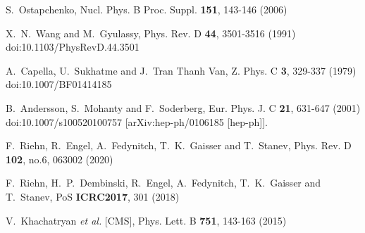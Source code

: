 \begin{thebibliography}{99}
S.~Ostapchenko,
Nucl. Phys. B Proc. Suppl. \textbf{151}, 143-146 (2006)










X.~N.~Wang and M.~Gyulassy,
Phys. Rev. D \textbf{44}, 3501-3516 (1991)
doi:10.1103/PhysRevD.44.3501


A.~Capella, U.~Sukhatme and J.~Tran Thanh Van,
Z. Phys. C \textbf{3}, 329-337 (1979)
doi:10.1007/BF01414185

B.~Andersson, S.~Mohanty and F.~Soderberg,
Eur. Phys. J. C \textbf{21}, 631-647 (2001)
doi:10.1007/s100520100757
[arXiv:hep-ph/0106185 [hep-ph]].

F.~Riehn, R.~Engel, A.~Fedynitch, T.~K.~Gaisser and T.~Stanev,
Phys. Rev. D \textbf{102}, no.6, 063002 (2020)

F.~Riehn, H.~P.~Dembinski, R.~Engel, A.~Fedynitch, T.~K.~Gaisser and T.~Stanev,
PoS \textbf{ICRC2017}, 301 (2018)


V.~Khachatryan \textit{et al.} [CMS],
Phys. Lett. B \textbf{751}, 143-163 (2015)








\end{thebibliography}
